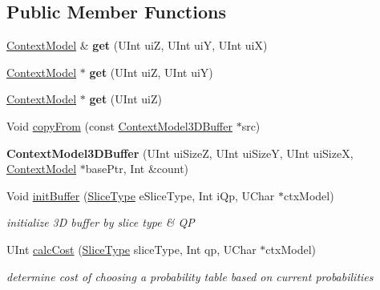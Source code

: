 \subsection*{Public Member Functions}
\begin{DoxyCompactItemize}
\item 
\mbox{\label{class_context_model3_d_buffer_a5f0be0638598ba0bd552335f92d4f0b6}} 
\hyperlink{class_context_model}{Context\+Model} \& {\bfseries get} (U\+Int uiZ, U\+Int uiY, U\+Int uiX)
\item 
\mbox{\label{class_context_model3_d_buffer_a038d0eef0b3911c98a21be6c394096ce}} 
\hyperlink{class_context_model}{Context\+Model} $\ast$ {\bfseries get} (U\+Int uiZ, U\+Int uiY)
\item 
\mbox{\label{class_context_model3_d_buffer_a70ed7ef9f395bc0610a0047640df3cb4}} 
\hyperlink{class_context_model}{Context\+Model} $\ast$ {\bfseries get} (U\+Int uiZ)
\item 
Void \hyperlink{class_context_model3_d_buffer_a3d73c7fc6d143aac1d7fdafd32e986d1}{copy\+From} (const \hyperlink{class_context_model3_d_buffer}{Context\+Model3\+D\+Buffer} $\ast$src)
\end{DoxyCompactItemize}
{\bf }\par
\begin{DoxyCompactItemize}
\item 
\mbox{\label{class_context_model3_d_buffer_a37a8f7e525264bca5f500b2cb938f740}} 
{\bfseries Context\+Model3\+D\+Buffer} (U\+Int ui\+SizeZ, U\+Int ui\+SizeY, U\+Int ui\+SizeX, \hyperlink{class_context_model}{Context\+Model} $\ast$base\+Ptr, Int \&count)
\item 
Void \hyperlink{class_context_model3_d_buffer_a239420ca283a9f98e928a0d4e239fa0d}{init\+Buffer} (\hyperlink{_type_def_8h_a8fc5fd31653a387f7430d29863620f71}{Slice\+Type} e\+Slice\+Type, Int i\+Qp, U\+Char $\ast$ctx\+Model)
\begin{DoxyCompactList}\small\item\em initialize 3D buffer by slice type \& QP \end{DoxyCompactList}\item 
U\+Int \hyperlink{class_context_model3_d_buffer_abc2178783028a2556a5c8c24e67811dc}{calc\+Cost} (\hyperlink{_type_def_8h_a8fc5fd31653a387f7430d29863620f71}{Slice\+Type} slice\+Type, Int qp, U\+Char $\ast$ctx\+Model)
\begin{DoxyCompactList}\small\item\em determine cost of choosing a probability table based on current probabilities \end{DoxyCompactList}\end{DoxyCompactItemize}


